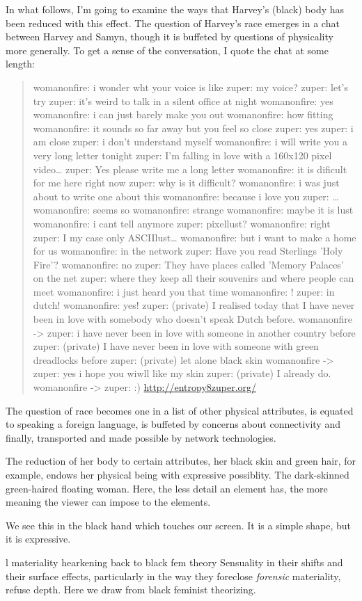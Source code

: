 \documentclass[11pt]{article}
\begin{document}
\begin{enumerate}
In what follows, I'm going to examine the ways that Harvey's (black)
body has been reduced with this effect. The question of Harvey's race
emerges in a chat between Harvey and Samyn, though it is buffeted by
questions of physicality more generally. To get a sense of the
conversation, I quote the chat at some length: 
\begin{quote}
womanonfire: i wonder wht your voice is like
zuper: my voice?
zuper: let's try
zuper: it's weird to talk in a silent office at night
womanonfire: yes
womanonfire: i can just barely make you out
womanonfire: how fitting
womanonfire: it sounds so far away but you feel so close
zuper: yes
zuper: i am close
zuper: i don't understand myself
womanonfire: i will write you a very long letter tonight
zuper: I'm falling in love with a 160x120 pixel video\ldots{}
zuper: Yes please write me a long letter
womanonfire: it is dificult for me here right now
zuper: why is it difficult?
womanonfire: i was just about to write one about this
womanonfire: because i love you
zuper: \ldots{}
womanonfire: seems so 
womanonfire: strange
womanonfire: maybe it is lust
womanonfire: i cant tell anymore
zuper: pixellust?
womanonfire: right
zuper: I my case only ASCIIlust\ldots{}
womanonfire: but i want to make a home for us
womanonfire: in the network
zuper: Have you read Sterlings 'Holy Fire'?
womanonfire: no
zuper: They have places called 'Memory Palaces' on the net
zuper: where they keep all their souvenirs and where people can meet
womanonfire: i just heard you that time
womanonfire: !
zuper: in dutch!
womanonfire: yes!
zuper: (private) I realised today that I have never been in love with somebody who doesn't speak Dutch before.
womanonfire -> zuper: i have never been in love with someone in another country before
zuper: (private) I have never been in love with someone with green dreadlocks before
zuper: (private) let alone black skin
womanonfire -> zuper: yes i hope you wiwll like my skin
zuper: (private) I already do.
womanonfire -> zuper: :) \url{http://entropy8zuper.org/} 
\end{quote}
The question of race becomes one in a list of other physical
attributes, is equated to speaking a foreign language, is buffeted by
concerns about connectivity and finally, transported and made possible
by network technologies. 

The reduction of her body to certain attributes, her black skin and
green hair, for example, endows her physical being with expressive
possiblity. The dark-skinned green-haired floating woman. Here, the
less detail an element has, the more meaning the viewer can impose to
the elements.

We see this in the black hand which touches our screen. It is a simple
shape, but it is expressive.

l materiality hearkening back to black fem theory 
Sensuality in their shifts and their surface effects, particularly in
the way they foreclose \emph{forensic} materiality, refuse depth. Here we
draw from black feminist theorizing.
\end{enumerate}
\end{document}
